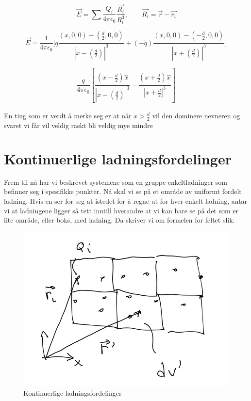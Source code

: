     \[
    \vec{E} =  ∑ \limits_{}^{} \frac{Q_i }{4 π \epsilon_0} \frac{\vec{R_i}}{R_i^{3}}, \qquad \vec{R_i} = \vec{r} - \vec{r_i}
    \]

    \[
    \vec{E} = \frac{1}{4 π \epsilon_0} \Bigg[ q \frac{(x,0,0) - \left(\frac{d}{2}, 0, 0\right)_{}^{}}{\left|x - \left(\frac{d}{2}\right)_{}^{}\right|^{3}} + (-q) \frac{(x,0,0) - \left(- \frac{d}{2}, 0, 0\right)_{}^{}}{\left|x + \left(\frac{d}{2}\right)_{}^{}\right|^{3}} \Bigg]_{}^{}
    \]

    \[
    \frac{q}{4 π \epsilon_0} \left[ \frac{\left(x - \frac{d}{2}\right)_{}^{}\hat{x}}{\left|x - \left(\frac{d}{2}\right)_{}^{}\right|^{3}} - \frac{\left(x + \frac{d}{2}\right)_{}^{}\hat{x}}{\left|x + \frac{d}{2}\right|^{3}} \right]_{}^{}
    \]

   En ting som er verdt å merke seg er at når $ x > \frac{d}{2} $ vil den dominere nevneren og svaret vi får vil veldig raskt bli veldig mye mindre

  \section*{Kontinuerlige ladningsfordelinger }
    Frem til nå har vi beskrevet systemene som en gruppe enkeltladninger som befinner seg i spesifikke punkter. Nå skal vi se på et område av uniformt fordelt ladning. Hvis en ser for seg at istedet for å regne ut for hver enkelt ladning, antar vi at ladningene ligger så tett inntill hverandre at vi kan bare se på det som er lite område, eller boks, med ladning. Da skriver vi om formelen for feltet slik:
    \begin{figure}[h!]
      \centering
      \includegraphics[scale = .7]{Bilder/Kontinuerlige_ladningsfordelinger.png}
      \caption{Kontinuerlige ladningsfordelinger }
      \label{fig:Kontinuerlige Ladningsfordelinger}
    \end{figure}

